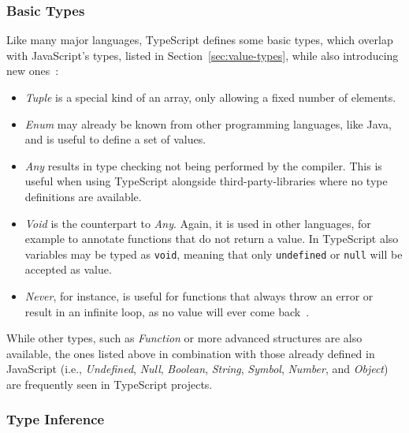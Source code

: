 \subsubsection{Basic Types}
\label{sec:ts-basic-types}

Like many major languages, TypeScript defines some basic types, which overlap with JavaScript's types, listed in Section~\ref{sec:value-types}, while also introducing new ones~\cite{TypeScriptHandbook:BasicTypes}:
\begin{itemize}
  \item \emph{Tuple} is a special kind of an array, only allowing a fixed number of elements.
  \item \emph{Enum} may already be known from other programming languages, like Java, and is useful to define a set of values.
  \item \emph{Any} results in type checking not being performed by the compiler. This is useful when using TypeScript alongside third-party-libraries where no type definitions are available.
  \item \emph{Void} is the counterpart to \emph{Any}. Again, it is used in other languages, for example to annotate functions that do not return a value. In TypeScript also variables may be typed as \texttt{void}, meaning that only \texttt{undefined} or \texttt{null} will be accepted as value.
  \item \emph{Never}, for instance, is useful for functions that always throw an error or result in an infinite loop, as no value will ever come back~\cite{TypeScriptHandbook:BasicTypes}.
\end{itemize}
While other types, such as \emph{Function} or more advanced structures are also available, the ones listed above in combination with those already defined in JavaScript (i.e., \emph{Undefined}, \emph{Null}, \emph{Boolean}, \emph{String}, \emph{Symbol}, \emph{Number}, and \emph{Object}) are frequently seen in TypeScript projects.

\subsubsection{Type Inference}
\label{sec:ts-type-inference}


